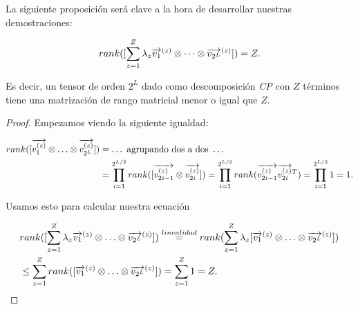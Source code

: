 La siguiente proposición será clave a la hora de desarrollar nuestras demostraciones:

\begin{proposicion} \label{prop:rango_matricial_descomp_cp}

    \begin{equation}
        rank([\sum_{z = 1}^Z \lambda_z \nv{v_1}^{(z)} \otimes \cdots \otimes \nv{v_{2^L}}^{(z)}]) = Z.
    \end{equation}

    Es decir, un tensor de orden $2^L$ dado como descomposición \textit{CP} con $Z$ términos tiene una matrización de rango matricial menor o igual que $Z$.

\end{proposicion}

\begin{proof}

    Empezamos viendo la siguiente igualdad:

    \begin{equation}
        \begin{split}
            rank([\nv{v_1^{(z)}} \otimes \ldots \otimes \nv{v_{2^L}^{(z)}}]) &= \ldots \text{  agrupando dos a dos   } \ldots \\
            &= \prod_{i = 1}^{2^{L/2}} rank([\nv{v_{2i - 1}^{(z)}} \otimes\nv{v_{2i}^{(z)}}]) = \prod_{i = 1}^{2^{L/2}} rank(\nv{v_{2i - 1}^{(z)}} \nv{v_{2i}^{(z)}}^T) = \prod_{i = 1}^{2^{L/2}} 1 = 1.
        \end{split}
    \end{equation}

    Usamos esto para calcular nuestra ecuación

    \begin{equation}
        \begin{split}
            &rank([\sum_{z = 1}^Z \lambda_z \nv{v_1}^{(z)} \otimes \ldots \otimes \nv{v_{2^L}}^{(z)}]) \encima{=}{linealidad} rank(\sum_{z = 1}^Z \lambda_z [\nv{v_1}^{(z)} \otimes \ldots \otimes \nv{v_{2^L}}^{(z)}]) \\
            &\leq \sum_{z = 1}^Z rank([\nv{v_1}^{(z)} \otimes \ldots \otimes \nv{v_{2^L}}^{(z)}]) = \sum_{z = 1}^Z 1 = Z.
        \end{split}
    \end{equation}
\end{proof}

